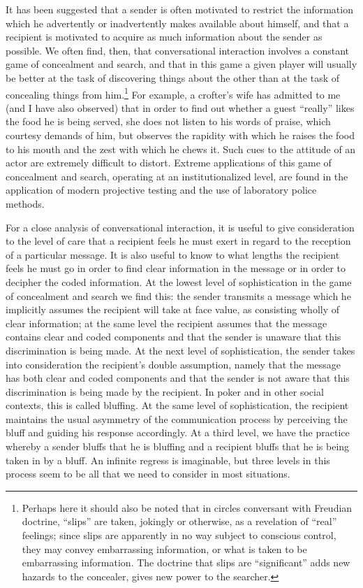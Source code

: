 \documentclass[openany,nobib]{tufte-book}
\begin{document}
It has been suggested that a sender is often motivated to restrict the
information which he advertently or inadvertently makes available about
himself, and that a recipient is motivated to acquire as much
information about the sender as possible. We often find, then, that
conversational interaction involves a constant game of concealment and
search, and that in this game a given player will usually be better at
the task of discovering things about the other than at the task of
concealing things from him.\footnote{Perhaps here it should also be
  noted that in circles conversant with Freudian doctrine, ``slips'' are
  taken, jokingly or otherwise, as a revelation of ``real'' feelings;
  since slips are apparently in no way subject to conscious control,
  they may con­vey embarrassing information, or what is taken to be
  embarrassing information. The doctrine that slips are ``significant''
  adds new hazards to the concealer, gives new power to the searcher.}
For example, a crofter's wife has admitted to me (and I have also
observed) that in order to find out whether a guest ``really'' likes the
food he is being served, she does not listen to his words of praise,
which courtesy demands of him, but observes the rapidity with which he
raises the food to his mouth and the zest with which he chews it. Such
cues to the attitude of an actor are extremely difficult to distort.
Extreme applications of this game of concealment and search, operating
at an institutionalized level, are found in the application of modern
projective testing and the use of laboratory police methods.

For a close analysis of conversational interaction, it is useful to give
consideration to the level of care that a re­cipient feels he must exert
in regard to the reception of a par­ticular message. It is also useful to
know to what lengths the recipient feels he must go in order to find
clear information in the message or in order to decipher the coded
information. At the lowest level of sophistication in the game of
concealment and search we find this: the sender transmits a message
which he implicitly assumes the recipient will take at face value, as
consisting wholly of clear information; at the same level the recipient
assumes that the message contains clear and coded com­ponents and that
the sender is unaware that this discrimination is being made. At the
next level of sophistication, the sender takes into consideration the
recipient's double assumption, namely that the message has both clear
and coded components and that the sender is not aware that this
discrimination is being made by the recipient. In poker and in other
social contexts, this is called bluffing. At the same level of
sophistication, the re­cipient maintains the usual asymmetry of the
communication proc­ess by perceiving the bluff and guiding his response
accordingly. At a third level, we have the practice whereby a sender
bluffs that he is bluffing and a recipient bluffs that he is being taken
in by a bluff. An infinite regress is imaginable, but three levels in
this process seem to be all that we need to con­sider in most situations.
\end{document}
